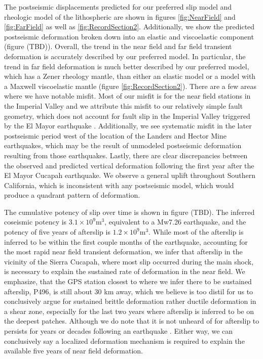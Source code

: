 \documentclass[1p]{elsarticle}
\begin{document}
The postseismic displacements predicted for our preferred slip model and rheologic model of the lithospheric are shown in figures \ref{fig:NearField} and \ref{fig:FarField} as well as \ref{fig:RecordSection2}.  Additionally, we show the predicted postseismic deformation broken down into an elastic and viscoelastic component (figure (TBD)).  Overall, the trend in the near field and far field transient deformation is accurately described by our preferred model.  In particular, the trend in far field deformation is much better described by our preferred model, which has a Zener rheology mantle, than either an elastic model or a model with a Maxwell viscoelastic mantle (figure \ref{fig:RecordSection2}).  There are a few areas where we have notable misfit.  Most of our misfit is for the near field stations in the Imperial Valley and we attribute this misfit to our relatively simple fault geometry, which does not account for fault slip in the Imperial Valley triggered by the El Mayor earthquake \citep{Wei2011a,Wei2015}.
Additionally, we see systematic misfit in the later postseismic period west of the location of the Landers and Hector Mine earthquakes, which may be the result of unmodeled postseismic deformation resulting from those earthquakes.  Lastly, there are clear discrepancies between the observed and predicted vertical deformation following the first year after the El Mayor Cucapah earthquake. We observe a general uplift throughout Southern California, which is inconsistent with any postseismic model, which would produce a quadrant pattern of deformation.

The cumulative potency of slip over time is shown in figure (TBD). The inferred coseismic potency is $3.1\times10^{9} \mathrm{m}^3$, equivalent to a Mw7.26 earthquake, and the potency of five years of afterslip is $1.2\times10^{9} \mathrm{m}^3$.  While most of the afterslip is inferred to be within the first couple months of the earthquake, accounting for the most rapid near field transient deformation, we infer that afterslip in the vicinity of the Sierra Cucapah, where most slip occurred during the main shock, is necessary to explain the sustained rate of deformation in the near field.  We emphasize, that the GPS station closest to where we infer there to be sustained afterslip, P496, is still about 30 km away, which we believe is too distil for us to conclusively argue for sustained brittle deformation rather ductile deformation in a shear zone, especially for the last two years where afterslip is inferred to be on the deepest patches.    Although we do note that it is not unheard of for afterslip to persists for years or decades following an earthquake \citep{Cakir2012}.  Either way, we can conclusively say a localized deformation mechanism is required to explain the available five years of near field deformation.             
  
\end{document}
